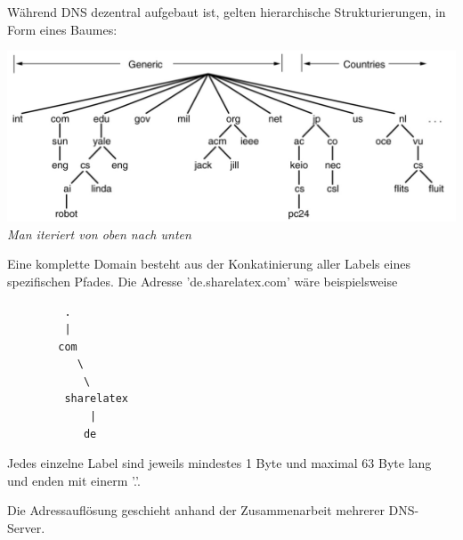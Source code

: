\documentclass{scrartcl}
\begin{document}
    Während DNS dezentral aufgebaut ist, gelten hierarchische Strukturierungen, in Form eines Baumes:
    \begin{center}
        \includegraphics[width=\textwidth]{DNSNameSpace.png}\\
        \textit{Man iteriert von oben nach unten}
    \end{center}
    Eine komplette Domain besteht aus der Konkatinierung aller Labels eines spezifischen Pfades. Die Adresse 'de.sharelatex.com' wäre beispielsweise
    \begin{verbatim}
         .
         |
        com
           \
            \
         sharelatex
             |
            de
    \end{verbatim}
    Jedes einzelne Label sind jeweils mindestes 1 Byte und maximal 63 Byte lang und enden mit einerm '.'.
    
    Die Adressauflösung geschieht anhand der Zusammenarbeit mehrerer DNS-Server.
    
\end{document}
